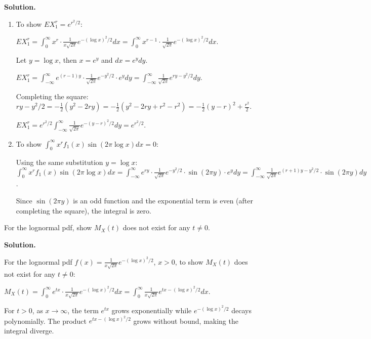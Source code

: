 \noindent\textbf{Solution.}
\begin{enumerate}[label=(\alph*)]
    \item To show $EX_1^r = e^{r^2/2}$:
    
    $EX_1^r = \int_0^\infty x^r \cdot \frac{1}{x\sqrt{2\pi}}e^{-(\log x)^2/2}dx = \int_0^\infty x^{r-1} \cdot \frac{1}{\sqrt{2\pi}}e^{-(\log x)^2/2}dx$.
    
    Let $y = \log x$, then $x = e^y$ and $dx = e^y dy$.
    
    $EX_1^r = \int_{-\infty}^{\infty} e^{(r-1)y} \cdot \frac{1}{\sqrt{2\pi}}e^{-y^2/2} \cdot e^y dy = \int_{-\infty}^{\infty} \frac{1}{\sqrt{2\pi}}e^{ry - y^2/2}dy$.
    
    Completing the square: $ry - y^2/2 = -\frac{1}{2}(y^2 - 2ry) = -\frac{1}{2}(y^2 - 2ry + r^2 - r^2) = -\frac{1}{2}(y-r)^2 + \frac{r^2}{2}$.
    
    $EX_1^r = e^{r^2/2} \int_{-\infty}^{\infty} \frac{1}{\sqrt{2\pi}}e^{-(y-r)^2/2}dy = e^{r^2/2}$.
    
    \item To show $\int_0^\infty x^r f_1(x)\sin(2\pi\log x)dx = 0$:
    
    Using the same substitution $y = \log x$:
    $\int_0^\infty x^r f_1(x)\sin(2\pi\log x)dx = \int_{-\infty}^{\infty} e^{ry} \cdot \frac{1}{\sqrt{2\pi}}e^{-y^2/2} \cdot \sin(2\pi y) \cdot e^y dy = \int_{-\infty}^{\infty} \frac{1}{\sqrt{2\pi}}e^{(r+1)y - y^2/2} \cdot \sin(2\pi y) dy$.
    
    Since $\sin(2\pi y)$ is an odd function and the exponential term is even (after completing the square), the integral is zero.
\end{enumerate}

\begin{problembox}
For the lognormal pdf, show $M_X(t)$ does not exist for any $t\neq0$.
\end{problembox}

\noindent\textbf{Solution.}

For the lognormal pdf $f(x) = \frac{1}{x\sqrt{2\pi}}e^{-(\log x)^2/2}$, $x > 0$, to show $M_X(t)$ does not exist for any $t \neq 0$:

$M_X(t) = \int_0^\infty e^{tx} \cdot \frac{1}{x\sqrt{2\pi}}e^{-(\log x)^2/2}dx = \int_0^\infty \frac{1}{x\sqrt{2\pi}}e^{tx - (\log x)^2/2}dx$.

For $t > 0$, as $x \to \infty$, the term $e^{tx}$ grows exponentially while $e^{-(\log x)^2/2}$ decays polynomially. The product $e^{tx - (\log x)^2/2}$ grows without bound, making the integral diverge.

